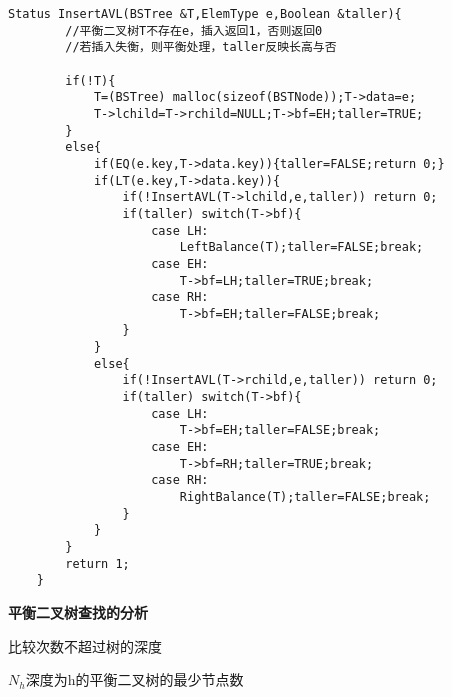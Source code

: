 \documentclass[UTF8]{ctexart}
\newcommand{\mb}[1]{\textbf{#1}}
\newcommand{\p}{\par}
\begin{document}
\begin{lstlisting}[style=v1]
    Status InsertAVL(BSTree &T,ElemType e,Boolean &taller){
        //平衡二叉树T不存在e，插入返回1，否则返回0
        //若插入失衡，则平衡处理，taller反映长高与否

        if(!T){
            T=(BSTree) malloc(sizeof(BSTNode));T->data=e;
            T->lchild=T->rchild=NULL;T->bf=EH;taller=TRUE;
        }
        else{
            if(EQ(e.key,T->data.key)){taller=FALSE;return 0;}
            if(LT(e.key,T->data.key)){
                if(!InsertAVL(T->lchild,e,taller)) return 0;
                if(taller) switch(T->bf){
                    case LH:
                        LeftBalance(T);taller=FALSE;break;
                    case EH:
                        T->bf=LH;taller=TRUE;break;
                    case RH:
                        T->bf=EH;taller=FALSE;break;
                }
            }
            else{
                if(!InsertAVL(T->rchild,e,taller)) return 0;
                if(taller) switch(T->bf){
                    case LH:
                        T->bf=EH;taller=FALSE;break;
                    case EH:
                        T->bf=RH;taller=TRUE;break;
                    case RH:
                        RightBalance(T);taller=FALSE;break;
                }
            }
        }
        return 1;
    }
\end{lstlisting}





\mb{平衡二叉树查找的分析}\p
比较次数不超过树的深度

$N_h$深度为h的平衡二叉树的最少节点数

\end{document}
